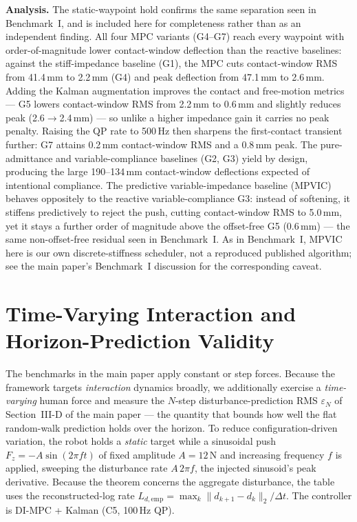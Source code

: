 \documentclass[journal]{IEEEtran}
\begin{document}
\textbf{Analysis.} The static-waypoint hold confirms the same separation
seen in Benchmark~I, and is included here for completeness rather than
as an independent finding. All four MPC variants (G4--G7) reach every
waypoint with order-of-magnitude lower contact-window deflection than
the reactive baselines: against the stiff-impedance baseline (G1), the
MPC cuts contact-window RMS from 41.4\,mm to 2.2\,mm (G4) and peak
deflection from 47.1\,mm to 2.6\,mm. Adding the Kalman augmentation
improves the contact and free-motion metrics --- G5 lowers contact-window
RMS from 2.2\,mm to 0.6\,mm and slightly reduces peak (2.6$\to$2.4\,mm)
--- so unlike a higher impedance gain it carries no peak penalty. Raising
the QP rate to 500\,Hz then sharpens the first-contact transient
further: G7 attains 0.2\,mm contact-window RMS and a 0.8\,mm peak. The
pure-admittance and variable-compliance baselines (G2, G3) yield by
design, producing the large 190--134\,mm contact-window deflections
expected of intentional compliance. The predictive variable-impedance
baseline (MPVIC) behaves oppositely to the reactive variable-compliance
G3: instead of softening, it stiffens predictively to reject the push,
cutting contact-window RMS to 5.0\,mm, yet it stays a further order of
magnitude above the offset-free G5 (0.6\,mm) --- the same non-offset-free
residual seen in Benchmark~I. As in Benchmark~I, MPVIC here is our own
discrete-stiffness scheduler, not a reproduced published algorithm; see
the main paper's Benchmark~I discussion for the corresponding caveat.

\section{Time-Varying Interaction and Horizon-Prediction Validity}\label{sec:tv}

The benchmarks in the main paper apply constant or step forces. Because
the framework targets \emph{interaction} dynamics broadly, we
additionally exercise a \emph{time-varying} human force and measure the
$N$-step disturbance-prediction RMS $\varepsilon_N$ of
Section~III-D of the main paper --- the quantity that bounds how well the
flat random-walk prediction holds over the horizon. To reduce
configuration-driven variation, the robot
holds a \emph{static} target while a sinusoidal push
$F_z=-A\sin(2\pi ft)$ of fixed amplitude $A=12$\,N and increasing
frequency $f$ is applied, sweeping the disturbance rate
$A\,2\pi f$, the injected sinusoid's peak derivative. Because the theorem
concerns the aggregate disturbance, the table uses the reconstructed-log rate
$L_{d,\mathrm{emp}}=\max_k\|d_{k+1}-d_k\|_2/\Delta t$.
The controller is DI-MPC + Kalman (C5, 100\,Hz
QP).
\end{document}
